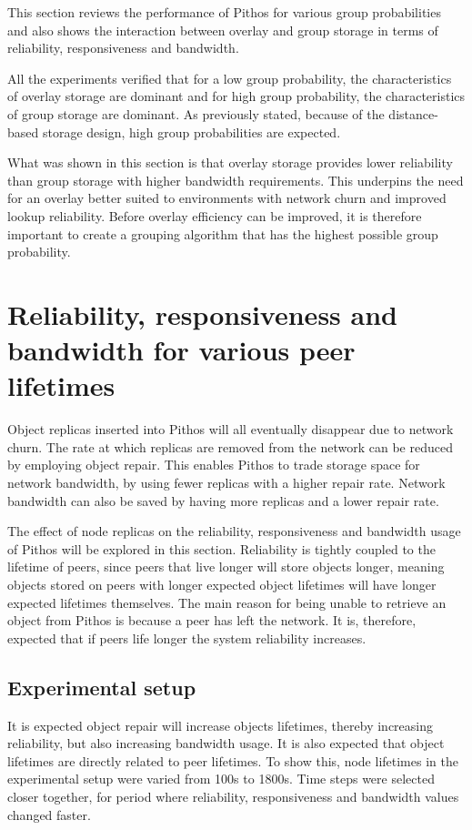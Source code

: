 This section reviews the performance of Pithos for various group probabilities and also shows the interaction between overlay and group storage in terms of reliability, responsiveness and bandwidth.

All the experiments verified that for a low group probability, the characteristics of overlay storage are dominant and for high group probability, the characteristics of group storage are dominant. As previously stated, because of the distance-based storage design, high group probabilities are expected.

What was shown in this section is that overlay storage provides lower reliability than group storage with higher bandwidth requirements. This underpins the need for an overlay better suited to environments with network churn and improved lookup reliability. Before overlay efficiency can be improved, it is therefore important to create a grouping algorithm that has the highest possible group probability.

\section{Reliability, responsiveness and bandwidth for various peer lifetimes}
\label{repair_results}

Object replicas inserted into Pithos will all eventually disappear due to network churn. The rate at which replicas are removed from the network can be reduced by employing object repair. This enables Pithos to trade storage space for network bandwidth, by using fewer replicas with a higher repair rate. Network bandwidth can also be saved by having more replicas and a lower repair rate.

The effect of node replicas on the reliability, responsiveness and bandwidth usage of Pithos will be explored in this section. Reliability is tightly coupled to the lifetime of peers, since peers that live longer will store objects longer, meaning objects stored on peers with longer expected object lifetimes will have longer expected lifetimes themselves. The main reason for being unable to retrieve an object from Pithos is because a peer has left the network. It is, therefore, expected that if peers life longer the system reliability increases.

\subsection{Experimental setup}

It is expected object repair will increase objects lifetimes, thereby increasing reliability, but also increasing bandwidth usage. It is also expected that object lifetimes are directly related to peer lifetimes. To show this, node lifetimes in the experimental setup were varied from 100s to 1800s. Time steps were selected closer together, for period where reliability, responsiveness and bandwidth values changed faster.

